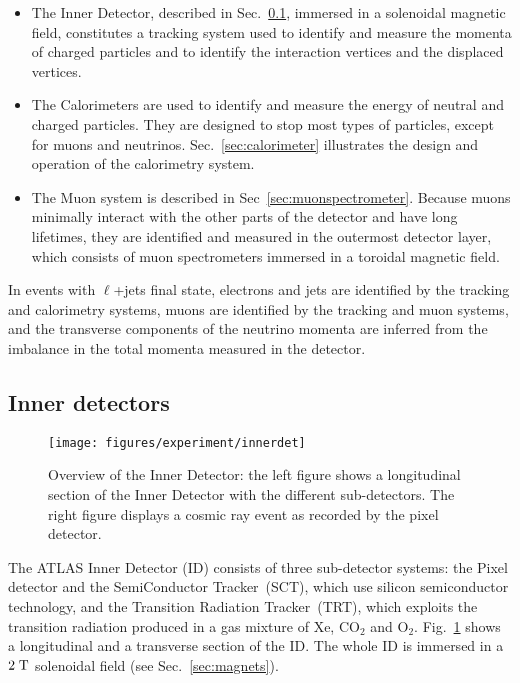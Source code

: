 \begin{itemize}
\item The Inner Detector, described in Sec.~\ref{sec:ID}, immersed in
  a solenoidal magnetic field, constitutes a tracking system used to
  identify and measure the momenta of charged particles and to identify
  the interaction vertices and the displaced vertices. 
\item The Calorimeters are used to identify and measure the energy of
  neutral and charged particles. They are designed to stop most types
  of particles, except for muons and
  neutrinos. Sec.~\ref{sec:calorimeter} illustrates the design and
  operation of the calorimetry system.
\item The Muon system is described in
  Sec~\ref{sec:muonspectrometer}. Because muons minimally interact
  with the other parts of the detector and have long lifetimes, they
  are identified and measured in the outermost detector
  layer, which consists of muon spectrometers immersed in a toroidal magnetic field. 
\end{itemize}

In \ttbar{} events with $\ell{}$+jets final state, electrons
and jets are identified by the tracking and calorimetry systems, muons
are identified by the tracking and muon systems, and the transverse
components of the neutrino momenta are inferred from the imbalance in
the total momenta measured in the detector.

\subsection{Inner detectors}
\label{sec:ID}

\begin{figure}[ht]
\centering
\texttt{[image: figures/experiment/innerdet]}
\caption[Overview of the Inner Detector]{
  Overview of the Inner Detector: 
  the left figure shows a longitudinal section of the Inner Detector
  with the different sub-detectors.
  The right figure displays a cosmic ray event as recorded by the pixel detector.}
\label{fig:ID}
\end{figure}

The ATLAS Inner Detector (ID) consists of three sub-detector systems:
the Pixel detector and the SemiConductor Tracker~(SCT), which use silicon semiconductor
technology, and the Transition Radiation Tracker~(TRT), 
which exploits the transition radiation produced in a gas mixture of Xe, CO$_2$ and O$_2$.
Fig.~\ref{fig:ID} shows a longitudinal and a transverse section of the ID.
The whole ID is immersed in a \mbox{$2 \; \mathrm{T}$} solenoidal field (see Sec.~\ref{sec:magnets}).

